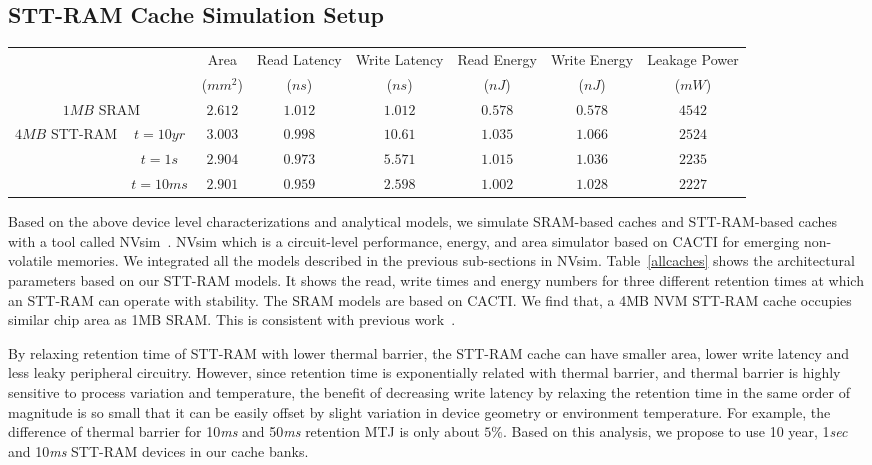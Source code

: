 \subsection{STT-RAM Cache Simulation Setup}

\begin{table*}[t]
 \scriptsize
  \centering
  \caption{16-way L2 Cache Simulation Results}
  \label{allcaches}
  \begin{tabular}{| c | c | c | c | c | c | c | c |}
    \hline\hline
    \multirow{2}{*}{} & & Area  & Read Latency & Write Latency & Read Energy & Write Energy & Leakage Power\\
  & & ($mm^2$) & ($ns$) & ($ns$) & ($nJ$) & ($nJ$) & ($mW$) \\
    \hline\hline
    \multicolumn{2}{|c|}{$1MB$ SRAM} & $2.612$ & $1.012$ & $1.012$ & $0.578$ & $0.578$ & $4542$ \\
    \hline
    \multirow{3}{*}{$4MB$ STT-RAM} & $t=10yr$ & $3.003$ & $0.998$ & $10.61$ & $1.035$ & $1.066$ & $2524$ \\
    & {$t=1s$} & $2.904$ & $0.973$ & $5.571$ & $1.015$ & $1.036$ & $2235$ \\
    & {$t=10ms$} & $2.901$ & $0.959$ & $2.598$ & $1.002$ & $1.028$ & $2227$ \\
    \hline\hline
  \end{tabular}
\end{table*}

Based on the above device level characterizations and analytical models, we simulate SRAM-based
caches and STT-RAM-based caches with a tool called NVsim~\cite{CACTI:PCRAMsim}. NVsim which is a
circuit-level performance, energy, and area simulator based on CACTI for emerging non-volatile
memories. We integrated all the models described in the previous sub-sections in NVsim.
Table~\ref{allcaches} shows the architectural parameters based on our STT-RAM models. It shows the
read, write times and energy numbers for three different retention times at which an STT-RAM can
operate with stability. The SRAM models are based on CACTI. We find that, a 4MB NVM
STT-RAM cache occupies similar chip area as 1MB SRAM. This is consistent with previous
work~\cite{CACTI:DAC08:Dong}.

By relaxing retention time of STT-RAM with lower thermal barrier, the STT-RAM cache can have smaller
area, lower write latency and less leaky peripheral circuitry. However, since retention time is
exponentially related with thermal barrier, and thermal barrier is highly sensitive to process
variation and temperature, the benefit of decreasing write latency by relaxing the retention time in
the same order of magnitude is so small that it can be easily offset by slight variation in device
geometry or environment temperature. For example, the difference of thermal barrier for 10{\it ms} and
50{\it ms} retention MTJ is only about $5\%$.
Based on this analysis, we propose to use 10 year, 1{\it sec} and 10{\it ms} STT-RAM devices in our
cache banks.
